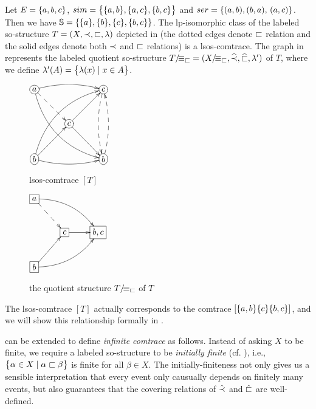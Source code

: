 \documentclass{llncs}
\begin{document}
\begin{example}
Let $E=\{a,b,c\}$, $sim = \bigl\{\{a,b\},\{a,c\},\{b,c\}\bigr\}$ and $ser=\set{(a,b),(b,a),$ $(a,c)}$. Then we have
$\mathbb{S}=\{\{a\},\{b\},\{c\},\{b,c\}\}$. The lp-isomorphic class  of the labeled so-structure $T=(X,\prec,\sqsubset,\lambda)$ depicted in  (the dotted edges denote $\sqsubset$ relation and the solid edges denote both $\prec$ and $\sqsubset$ relations) is a lsos-comtrace. The graph in  represents the labeled quotient  so-structure ${T}/\!{\equiv_{\sqsubset}}=({X}/\!{\equiv_{\sqsubset}},\widehat{\prec},\widehat{\sqsubset},{\lambda'})$ of $T$, where we define ${\lambda'}(A)= \bigl\{\lambda(x)\mid x\in A\bigr\}$.
\begin{figure}[ht]
\begin{minipage}{0.45\linewidth}\centering

$\xymatrix@C=3em @R=3em{
*+[o][F-]{a} \ar@{-->}[dr]\ar@/^/[rr] \ar@/_1.5pc/ [ddrr] & 	& *+[o][F-]{c}\ar@/_/ @{-->}[dd]\\
 		 &*+[o][F-]{c} \ar[ur]\ar[dr]		&\\
*+[o][F-]{b} \ar[ur]\ar@/_/[rr]\ar@/^1.5pc/ [uurr]  &	&*+[o][F-]{b}\ar@/_/ @{-->}[uu]
}$
\caption{lsos-comtrace $[T]$}
\label{fig:f1}
\end{minipage}
\begin{minipage}{0.5\linewidth}\centering
$\xymatrix@-1pc@C=2.5em @R=2.7em{
*+[F-]{a} \ar@{-->}[dr]\ar@/^1pc/[drr] & 	&\\
 		 &*+[F-]{c} \ar[r]		&*+[F-]{b,c}\\
*+[F-]{b} \ar[ur]\ar@/_1pc/[urr]  &	&
}$
\caption{the quotient structure ${T}/\!{\equiv_{\sqsubset}}$ of $T$}
\label{fig:f2}
\end{minipage}
\end{figure}



The lsos-comtrace $[T]$ actually corresponds to the comtrace $[\{a,b\}\{c\}\{b,c\}]$, and we will show this relationship formally in . 
\EOD
\label{ex:comtrace2}
\end{example}




\begin{remark}
 can be extended to define \emph{infinite comtrace} as follows. Instead of asking $X$ to be finite, we require a labeled so-structure to be  \emph{initially finite} (cf. \cite{JK97}), i.e., $\bigl\{\alpha\in X\mid \alpha \sqsubset\beta\bigr\}$ is finite for all $\beta\in X$. The initially-finiteness not only gives us a sensible interpretation that every event only  causually depends  on finitely many events, but also guarantees that the covering relations of $\hat{\prec}$ and $\hat{\sqsubset}$ are well-defined. \EOD
\end{remark}
\end{document}
